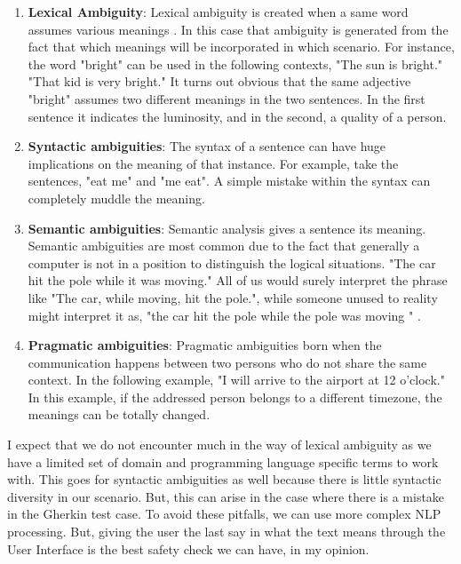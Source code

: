 \documentclass[conference, onecolumn, a4, 12pt]{IEEEtran}
\begin{document}
\begin{enumerate}
	\item \textbf{Lexical Ambiguity}:
	Lexical ambiguity is created when a same word assumes various meanings \cite{e2}. In this case that ambiguity is generated from the fact that which meanings will be incorporated in which scenario. For instance, the word "bright" can be used in the following contexts,
	"The sun is bright."
	"That kid is very bright."
	It turns out obvious that the same adjective "bright" assumes two different meanings in the two sentences. In the first sentence it indicates the luminosity, and in the second, a quality of a person.
	
	\item \textbf{Syntactic ambiguities}:
	The syntax of a sentence can have huge implications on the meaning of that instance. For example, take the sentences, "eat me" and "me eat". A simple mistake within the syntax can completely muddle the meaning.
	
	\item \textbf{Semantic ambiguities}:
	Semantic analysis gives a sentence its meaning. Semantic ambiguities are most common due to the fact that generally a computer is not in a position to distinguish the
	logical situations. "The car hit the pole while it was moving." All of us would surely interpret the phrase like "The car, while moving, hit the pole.", while someone unused to reality might interpret it as, "the car hit the pole while the pole was moving " \cite{e1}. 
	
	\item \textbf{Pragmatic ambiguities}:
	Pragmatic ambiguities born when the communication happens between two persons who do not share the same context. In the following example, "I will arrive to the airport at 12 o'clock." In this example, if the addressed person belongs to a different timezone, the meanings can be totally changed. 
	 	 
\end{enumerate}

I expect that we do not encounter much in the way of lexical ambiguity as we have a limited set of domain and programming language specific terms to work with. This goes for syntactic ambiguities as well because there is little syntactic diversity in our scenario. But, this can arise in the case where there is a mistake in the Gherkin test case. To avoid these pitfalls, we can use more complex NLP processing. But, giving the user the last say in what the text means through the User Interface is the best safety check we can have, in my opinion.
\end{document}
